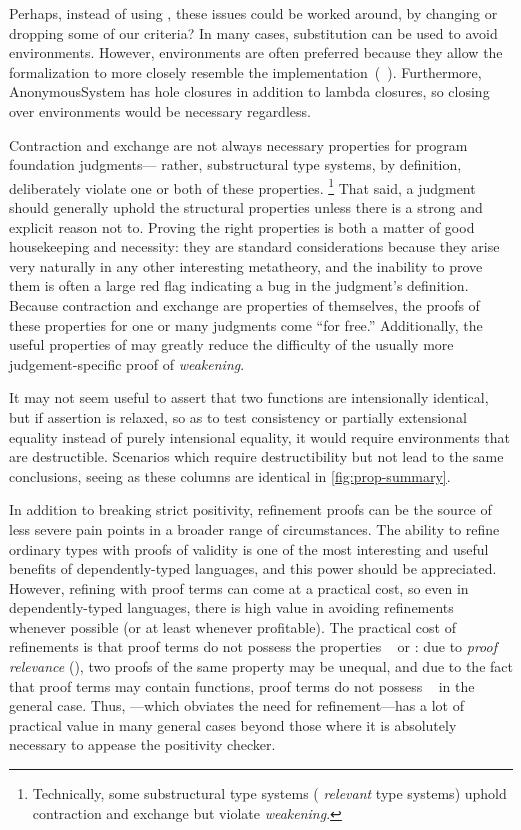 Perhaps, instead of using \dds, these issues could be worked around, by changing or dropping some of our criteria?
In many cases, substitution can be used to avoid environments. However, environments are often preferred because
they allow the formalization to more closely resemble the implementation~(\eg{}~\citep{Ancona:2014}). Furthermore,
AnonymousSystem has hole closures in addition to lambda closures, so closing over environments would be necessary regardless.

Contraction and exchange are not always necessary properties for program foundation judgments---%
rather, substructural type systems, by definition, deliberately violate one or both of these properties.%
\footnote{\hspace{0.01in}Technically, some substructural type systems (\eg{} \emph{relevant} type systems) uphold contraction and exchange but violate \emph{weakening}.}
That said, a judgment should generally uphold the structural properties unless there is a strong and explicit
reason not to. Proving the right properties
is both a matter of good housekeeping and necessity: they are standard
considerations because they arise very naturally in any other
interesting metatheory, and the inability to prove them is often a large red flag indicating a bug in the judgment's definition.
Because contraction and exchange are properties of \dds{} themselves,
the proofs of these properties for one or many judgments come ``for free.''
Additionally, the useful properties of \dds{} may greatly reduce the difficulty of the usually
more judgement-specific proof of \emph{weakening}.

It may not seem useful to assert that two functions are intensionally identical, but if assertion is relaxed,
so as to test consistency or partially extensional equality instead of purely intensional equality,
it would require environments that are destructible.
Scenarios which require destructibility but not \EqDec{} lead to the same conclusions,
seeing as these columns are identical in \autoref{fig:prop-summary}.

In addition to breaking strict positivity, refinement proofs can be the source of less severe pain points in
a broader range of circumstances.
The ability to refine ordinary types with proofs of validity is one of the most interesting and useful benefits of
dependently-typed languages, and this power should be appreciated. However, refining with proof terms can
come at a practical cost, so even in dependently-typed languages, there is high value in avoiding refinements
whenever possible (or at least whenever profitable). The practical cost of refinements is that proof terms
do not possess the properties \SemInj~ or \EqDec: due to \emph{proof relevance} (), two proofs of
the same property may be unequal, and due to the fact that proof terms may contain functions, proof terms do not
possess \EqDec~ in the general case. Thus, \SemTot---which obviates the need for refinement---has
a lot of practical value in many general cases beyond those where it is absolutely necessary to appease the
positivity checker.

